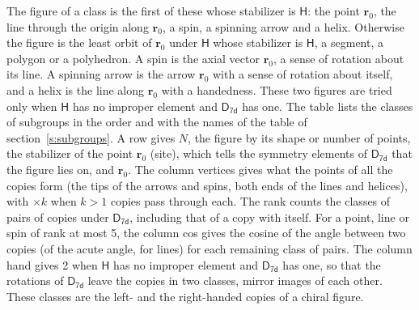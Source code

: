 \documentclass[10pt,a4paper]{article}
\numberwithin{equation}{section}
\newcommand{\grp}[1]{\mathsf{#1}}
\newcommand{\pointr}{\mathbf{r}}
\begin{document}
\leavevmode\label{n:head.figure}The figure of a class is the first of these whose stabilizer is $\grp{H}$: the point $\pointr_0$, the line through the origin along $\pointr_0$, a spin, a spinning arrow and a helix. Otherwise the figure is the least orbit of $\pointr_0$ under $\grp{H}$ whose stabilizer is $\grp{H}$, a segment, a polygon or a polyhedron. A spin is the axial vector $\pointr_0$, a sense of rotation about its line. A spinning arrow is the arrow $\pointr_0$ with a sense of rotation about itself, and a helix is the line along $\pointr_0$ with a handedness. These two figures are tried only when $\grp{H}$ has no improper element and $\grp{D_{7d}}$ has one. The table lists the classes of subgroups in the order and with the names of the table of section~\ref{s:subgroups}. \label{n:head.site}A row gives $N$, the figure by its shape or number of points, the stabilizer of the point $\pointr_0$ (site), which tells the symmetry elements of $\grp{D_{7d}}$ that the figure lies on, and $\pointr_0$. \label{n:head.vertices}The column vertices gives what the points of all the copies form (the tips of the arrows and spins, both ends of the lines and helices), with ${\times}k$ when $k > 1$ copies pass through each. \label{n:head.rank}The rank counts the classes of pairs of copies under $\grp{D_{7d}}$, including that of a copy with itself. \label{n:head.cos}For a point, line or spin of rank at most 5, the column cos gives the cosine of the angle between two copies (of the acute angle, for lines) for each remaining class of pairs. \label{n:head.hand}The column hand gives 2 when $\grp{H}$ has no improper element and $\grp{D_{7d}}$ has one, so that the rotations of $\grp{D_{7d}}$ leave the copies in two classes, mirror images of each other. These classes are the left- and the right-handed copies of a chiral figure.
\end{document}
